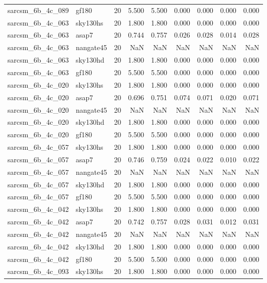 \begin{tabular}{llrrrrrrr}
sarcsm\_6b\_4c\_089 & gf180 & 20 & 5.500 & 5.500 & 0.000 & 0.000 & 0.000 & 0.000 \\
sarcsm\_6b\_4c\_063 & sky130hs & 20 & 1.800 & 1.800 & 0.000 & 0.000 & 0.000 & 0.000 \\
sarcsm\_6b\_4c\_063 & asap7 & 20 & 0.744 & 0.757 & 0.026 & 0.028 & 0.014 & 0.028 \\
sarcsm\_6b\_4c\_063 & nangate45 & 20 & NaN & NaN & NaN & NaN & NaN & NaN \\
sarcsm\_6b\_4c\_063 & sky130hd & 20 & 1.800 & 1.800 & 0.000 & 0.000 & 0.000 & 0.000 \\
sarcsm\_6b\_4c\_063 & gf180 & 20 & 5.500 & 5.500 & 0.000 & 0.000 & 0.000 & 0.000 \\
sarcsm\_6b\_4c\_020 & sky130hs & 20 & 1.800 & 1.800 & 0.000 & 0.000 & 0.000 & 0.000 \\
sarcsm\_6b\_4c\_020 & asap7 & 20 & 0.696 & 0.751 & 0.074 & 0.071 & 0.020 & 0.071 \\
sarcsm\_6b\_4c\_020 & nangate45 & 20 & NaN & NaN & NaN & NaN & NaN & NaN \\
sarcsm\_6b\_4c\_020 & sky130hd & 20 & 1.800 & 1.800 & 0.000 & 0.000 & 0.000 & 0.000 \\
sarcsm\_6b\_4c\_020 & gf180 & 20 & 5.500 & 5.500 & 0.000 & 0.000 & 0.000 & 0.000 \\
sarcsm\_6b\_4c\_057 & sky130hs & 20 & 1.800 & 1.800 & 0.000 & 0.000 & 0.000 & 0.000 \\
sarcsm\_6b\_4c\_057 & asap7 & 20 & 0.746 & 0.759 & 0.024 & 0.022 & 0.010 & 0.022 \\
sarcsm\_6b\_4c\_057 & nangate45 & 20 & NaN & NaN & NaN & NaN & NaN & NaN \\
sarcsm\_6b\_4c\_057 & sky130hd & 20 & 1.800 & 1.800 & 0.000 & 0.000 & 0.000 & 0.000 \\
sarcsm\_6b\_4c\_057 & gf180 & 20 & 5.500 & 5.500 & 0.000 & 0.000 & 0.000 & 0.000 \\
sarcsm\_6b\_4c\_042 & sky130hs & 20 & 1.800 & 1.800 & 0.000 & 0.000 & 0.000 & 0.000 \\
sarcsm\_6b\_4c\_042 & asap7 & 20 & 0.742 & 0.757 & 0.028 & 0.031 & 0.012 & 0.031 \\
sarcsm\_6b\_4c\_042 & nangate45 & 20 & NaN & NaN & NaN & NaN & NaN & NaN \\
sarcsm\_6b\_4c\_042 & sky130hd & 20 & 1.800 & 1.800 & 0.000 & 0.000 & 0.000 & 0.000 \\
sarcsm\_6b\_4c\_042 & gf180 & 20 & 5.500 & 5.500 & 0.000 & 0.000 & 0.000 & 0.000 \\
sarcsm\_6b\_4c\_093 & sky130hs & 20 & 1.800 & 1.800 & 0.000 & 0.000 & 0.000 & 0.000 \\

\end{tabular}
